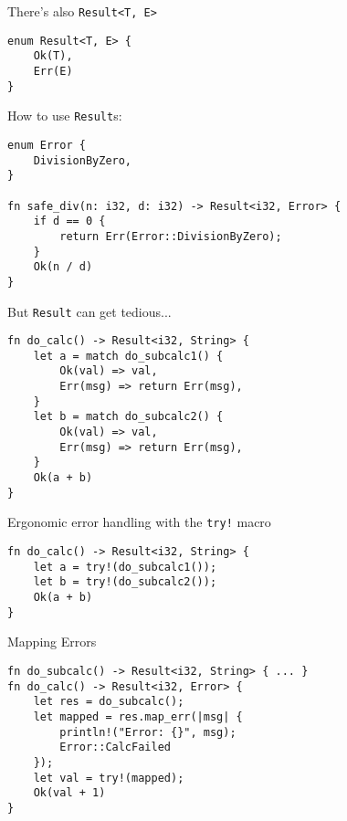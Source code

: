 
\begin{frame}[fragile]{There's also \texttt{Result<T, E>}}
\begin{verbatim}
enum Result<T, E> {
    Ok(T),
    Err(E)
}
\end{verbatim}
\end{frame}


\begin{frame}[fragile]{How to use \texttt{Result}s:}
\begin{verbatim}
enum Error {
    DivisionByZero,
}

fn safe_div(n: i32, d: i32) -> Result<i32, Error> {
    if d == 0 {
        return Err(Error::DivisionByZero);
    }
    Ok(n / d)
}
\end{verbatim}
\end{frame}


\begin{frame}[fragile]{But \texttt{Result} can get tedious...}
\begin{verbatim}
fn do_calc() -> Result<i32, String> {
    let a = match do_subcalc1() {
        Ok(val) => val,
        Err(msg) => return Err(msg),
    }
    let b = match do_subcalc2() {
        Ok(val) => val,
        Err(msg) => return Err(msg),
    }
    Ok(a + b)
}
\end{verbatim}
\end{frame}


\begin{frame}[fragile]{Ergonomic error handling with the \texttt{try!} macro}
\begin{verbatim}
fn do_calc() -> Result<i32, String> {
    let a = try!(do_subcalc1());
    let b = try!(do_subcalc2());
    Ok(a + b)
}
\end{verbatim}
\end{frame}


\begin{frame}[fragile]{Mapping Errors}
\begin{verbatim}
fn do_subcalc() -> Result<i32, String> { ... }
fn do_calc() -> Result<i32, Error> {
    let res = do_subcalc();
    let mapped = res.map_err(|msg| {
        println!("Error: {}", msg);
        Error::CalcFailed
    });
    let val = try!(mapped);
    Ok(val + 1)
}
\end{verbatim}
\end{frame}

